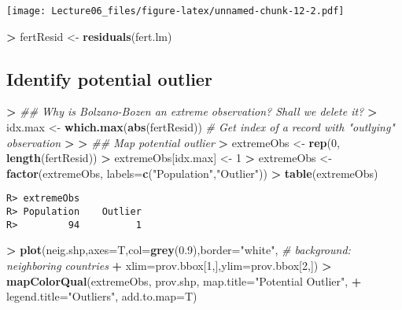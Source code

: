 \documentclass[
]{article}
\newenvironment{Shaded}{\begin{snugshade}}{\end{snugshade}}
\newcommand{\CommentTok}[1]{\textcolor[rgb]{0.56,0.35,0.01}{\textit{#1}}}
\newcommand{\DataTypeTok}[1]{\textcolor[rgb]{0.13,0.29,0.53}{#1}}
\newcommand{\DecValTok}[1]{\textcolor[rgb]{0.00,0.00,0.81}{#1}}
\newcommand{\ErrorTok}[1]{\textcolor[rgb]{0.64,0.00,0.00}{\textbf{#1}}}
\newcommand{\FloatTok}[1]{\textcolor[rgb]{0.00,0.00,0.81}{#1}}
\newcommand{\KeywordTok}[1]{\textcolor[rgb]{0.13,0.29,0.53}{\textbf{#1}}}
\newcommand{\NormalTok}[1]{#1}
\newcommand{\OperatorTok}[1]{\textcolor[rgb]{0.81,0.36,0.00}{\textbf{#1}}}
\newcommand{\StringTok}[1]{\textcolor[rgb]{0.31,0.60,0.02}{#1}}
\begin{document}
\texttt{[image: Lecture06\_files/figure-latex/unnamed-chunk-12-2.pdf]}

\begin{Shaded}
\begin{Highlighting}[]
\OperatorTok{>}\StringTok{ }\NormalTok{fertResid <-}\StringTok{ }\KeywordTok{residuals}\NormalTok{(fert.lm)}
\end{Highlighting}
\end{Shaded}

\hypertarget{identify-potential-outlier}{%
\subsection{Identify potential
outlier}\label{identify-potential-outlier}}

\begin{Shaded}
\begin{Highlighting}[]
\OperatorTok{>}\StringTok{ }\CommentTok{## Why is Bolzano-Bozen an extreme observation? Shall we delete it?}
\ErrorTok{>}\StringTok{ }\NormalTok{idx.max <-}\StringTok{ }\KeywordTok{which.max}\NormalTok{(}\KeywordTok{abs}\NormalTok{(fertResid))        }\CommentTok{# Get index of a record with "outlying" observation }
\OperatorTok{>}\StringTok{ }
\ErrorTok{>}\StringTok{ }\CommentTok{## Map potential outlier}
\ErrorTok{>}\StringTok{ }\NormalTok{extremeObs <-}\StringTok{ }\KeywordTok{rep}\NormalTok{(}\DecValTok{0}\NormalTok{, }\KeywordTok{length}\NormalTok{(fertResid))}
\OperatorTok{>}\StringTok{ }\NormalTok{extremeObs[idx.max] <-}\StringTok{ }\DecValTok{1}
\OperatorTok{>}\StringTok{ }\NormalTok{extremeObs <-}\StringTok{ }\KeywordTok{factor}\NormalTok{(extremeObs, }\DataTypeTok{labels=}\KeywordTok{c}\NormalTok{(}\StringTok{"Population"}\NormalTok{,}\StringTok{"Outlier"}\NormalTok{))}
\OperatorTok{>}\StringTok{ }\KeywordTok{table}\NormalTok{(extremeObs)}
\end{Highlighting}
\end{Shaded}

\begin{verbatim}
R> extremeObs
R> Population    Outlier 
R>         94          1
\end{verbatim}

\begin{Shaded}
\begin{Highlighting}[]
\OperatorTok{>}\StringTok{ }\KeywordTok{plot}\NormalTok{(neig.shp,}\DataTypeTok{axes=}\NormalTok{T,}\DataTypeTok{col=}\KeywordTok{grey}\NormalTok{(}\FloatTok{0.9}\NormalTok{),}\DataTypeTok{border=}\StringTok{"white"}\NormalTok{,                 }\CommentTok{# background: neighboring countries}
\OperatorTok{+}\StringTok{      }\DataTypeTok{xlim=}\NormalTok{prov.bbox[}\DecValTok{1}\NormalTok{,],}\DataTypeTok{ylim=}\NormalTok{prov.bbox[}\DecValTok{2}\NormalTok{,])                     }
\OperatorTok{>}\StringTok{ }\KeywordTok{mapColorQual}\NormalTok{(extremeObs, prov.shp, }\DataTypeTok{map.title=}\StringTok{"Potential Outlier"}\NormalTok{,}
\OperatorTok{+}\StringTok{               }\DataTypeTok{legend.title=}\StringTok{"Outliers"}\NormalTok{, }\DataTypeTok{add.to.map=}\NormalTok{T)        }
\end{Highlighting}
\end{Shaded}
\end{document}
